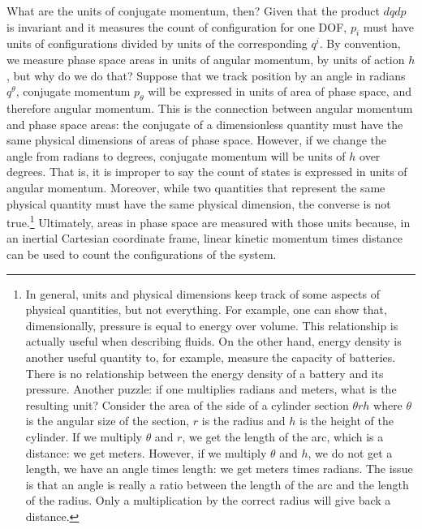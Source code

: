 What are the units of conjugate momentum, then? Given that the product $dq dp$ is invariant and it measures the count of configuration for one DOF, $p_i$ must have units of configurations divided by units of the corresponding $q^i$. By convention, we measure phase space areas in units of angular momentum, by units of action $h$, but why do we do that? Suppose that we track position by an angle in radians $q^\theta$, conjugate momentum $p_\theta$ will be expressed in units of area of phase space, and therefore angular momentum. This is the connection between angular momentum and phase space areas: the conjugate of a dimensionless quantity must have the same physical dimensions of areas of phase space. However, if we change the angle from radians to degrees, conjugate momentum will be units of $h$ over degrees. That is, it is improper to say the count of states is expressed in units of angular momentum. Moreover, while two quantities that represent the same physical quantity must have the same physical dimension, the converse is not true.\footnote{In general, units and physical dimensions keep track of some aspects of physical quantities, but not everything. For example, one can show that, dimensionally, pressure is equal to energy over volume. This relationship is actually useful when describing fluids. On the other hand, energy density is another useful quantity to, for example, measure the capacity of batteries. There is no relationship between the energy density of a battery and its pressure. Another puzzle: if one multiplies radians and meters, what is the resulting unit? Consider the area of the side of a cylinder section $\theta r h$ where $\theta$ is the angular size of the section, $r$ is the radius and $h$ is the height of the cylinder. If we multiply $\theta$ and $r$, we get the length of the arc, which is a distance: we get meters. However, if we multiply $\theta$ and $h$, we do not get a length, we have an angle times length: we get meters times radians. The issue is that an angle is really a ratio between the length of the arc and the length of the radius. Only a multiplication by the correct radius will give back a distance.} Ultimately, areas in phase space are measured with those units because, in an inertial Cartesian coordinate frame, linear kinetic momentum times distance can be used to count the configurations of the system.

